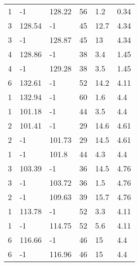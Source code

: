 \begin{table*}[h!]
\begin{tabular*}{\linewidth}{p{50pt}<{\centering}p{50pt}<{\centering}
p{60pt}<{\centering}p{60pt}<{\centering}p{60pt}<{\centering}p{70pt}<{\centering}}
1 & -1 & 128.22 & 56 & 1.2 & 0.34 \\
3 & 128.54 & -1 & 45 & 12.7 & 4.34 \\
3 & -1 & 128.87 & 45 & 13 & 4.34 \\
4 & 128.86 & -1 & 38 & 3.4 & 1.45 \\
4 & -1 & 129.28 & 38 & 3.5 & 1.45 \\
6 & 132.61 & -1 & 52 & 14.2 & 4.11 \\
1 & 132.94 & -1 & 60 & 1.6 & 4.4 \\
1 & 101.18 & -1 & 44 & 3.5 & 4.4 \\
2 & 101.41 & -1 & 29 & 14.6 & 4.61 \\
2 & -1 & 101.73 & 29 & 14.5 & 4.61 \\
1 & -1 & 101.8 & 44 & 4.3 & 4.4 \\
3 & 103.39 & -1 & 36 & 14.5 & 4.76 \\
3 & -1 & 103.72 & 36 & 1.5 & 4.76 \\
2 & -1 & 109.63 & 39 & 15.7 & 4.76 \\
1 & 113.78 & -1 & 52 & 3.3 & 4.11 \\
1 & -1 & 114.75 & 52 & 5.6 & 4.11 \\
6 & 116.66 & -1 & 46 & 15 & 4.4 \\
6 & -1 & 116.96 & 46 & 15 & 4.4 \\
\bottomrule
  \end{tabular*}
  \label{Ap4}
\end{table*}





